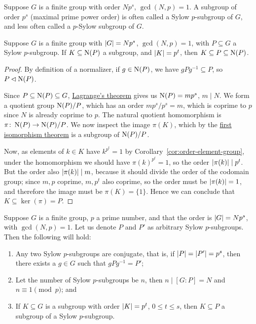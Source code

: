 \begin{definition}
    Suppose \(G\) is a finite group with order \(Np^s\), \(\gcd(N,p) = 1\).
    A subgroup of order \(p^s\) (maximal prime power order)
    is often called a Sylow \(p\)-subgroup of \(G\),
    and less often called a \(p\)-Sylow subgroup of \(G\).
\end{definition}
\begin{lemma}\label{lem:prime-power-sylow-subgroup}
    Suppose \(G\) is a finite group with \(\abs{G} = Np^s\), \(\gcd(N,p) = 1\),
    with \(P \subseteq G\) a Sylow \(p\)-subgroup.
    If \(K \subseteq \operatorname{N}(P)\) a subgroup, and \(\abs{K} = p^t\),
    then \(K \subseteq P \subseteq \operatorname{N}(P)\).
\end{lemma}
\begin{proof}
    By definition of a normalizer, if \(g \in \operatorname{N}(P)\),
    we have \(gPg^{-1} \subseteq P\), so \(P \lhd \operatorname{N}(P)\).

    Since \(P \subseteq \operatorname{N}(P) \subseteq G\),
    \hyperref[thm:lagrange]{Lagrange's theorem} gives us
    \(\operatorname{N}(P) = mp^s\), \(m \mid N\).
    We form a quotient group \(\operatorname{N}(P)/P\),
    which has an order \(mp^s/p^s = m\), which is coprime to \(p\)
    since \(N\) is already coprime to \(p\).
    The natural quotient homomorphism is
    \(\pi\colon\operatorname{N}(P)\to\operatorname{N}(P)/P\).
    We now inspect the image \(\pi(K)\),
    which by the \hyperref[thm:iso-1-group]{first isomorphism theorem}
    is a subgroup of \(\operatorname{N}(P)/P\).

    Now, as elements of \(k \in K\) have \(k^{p^t} = 1\)
    by Corollary~\ref{cor:order-element-group},
    under the homomorphism we should have \({\pi(k)}^{p^t} = 1\),
    so the order \(\abs{\pi(k)} \mid p^t\).
    But the order also \(\abs{\pi(k)} \mid m\),
    because it should divide the order of the codomain group;
    since \(m,p\) coprime, \(m,p^t\) also coprime,
    so the order must be \(\abs{\pi(k)} = 1\),
    and therefore the image must be \(\pi(K) = \{1\}\).
    Hence we can conclude that \(K \subseteq \ker(\pi) = P\).
\end{proof}
\begin{theorem}\label{thm:sylow-2}
    Suppose \(G\) is a finite group, \(p\) a prime number,
    and that the order is \(\abs{G} = Np^s\), with \(\gcd(N,p) = 1\).
    Let us denote \(P\) and \(P'\) as arbitrary Sylow \(p\)-subgroups.
    Then the following will hold:
    \begin{enumerate}[label={(\alph*)}, itemsep=0mm]
        \item Any two Sylow \(p\)-subgroups are conjugate,
            that is, if \(\abs{P} = \abs{P'} = p^s\),
            then there exists a \(g \in G\) such that \(gPg^{-1} = P'\);
        \item Let the number of Sylow \(p\)-subgroups be \(n\),
            then \(n \mid [G:P] = N\) and \(n \equiv 1 \pmod{p}\); and
        \item If \(K \subseteq G\) is a subgroup
            with order \(\abs{K} = p^t\), \(0 \leq t \leq s\),
            then \(K \subseteq P\) a subgroup of a Sylow \(p\)-subgroup.
    \end{enumerate}
\end{theorem}
